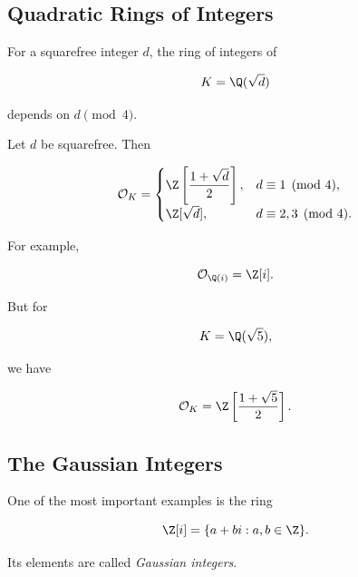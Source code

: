 \subsection{Quadratic Rings of Integers}
\label{subsec:quadratic-rings-of-integers}

For a squarefree integer \(d\), the ring of integers of

\[ K=\Q(\sqrt d) \]

depends on \(d\pmod4\).

\begin{theorem}
Let \(d\) be squarefree. Then

\[
\mathcal O_K=
\begin{cases}
\Z\left[\dfrac{1+\sqrt d}{2}\right],
& d\equiv1\pmod4,\\[8pt]
\Z[\sqrt d],
& d\equiv2,3\pmod4.
\end{cases}
\]
\end{theorem}

For example,

\[ \mathcal O_{\Q(i)}=\Z[i]. \]

But for

\[ K=\Q(\sqrt5), \]

we have

\[ \mathcal O_K=\Z\left[\frac{1+\sqrt5}{2}\right]. \]

\subsection{The Gaussian Integers}
\label{subsec:gaussian-integers}

One of the most important examples is the ring

\[ \Z[i]=\{a+bi:a,b\in\Z\}. \]

Its elements are called \emph{Gaussian integers}.

\begin{centereddiagram}
\end{centereddiagram}

